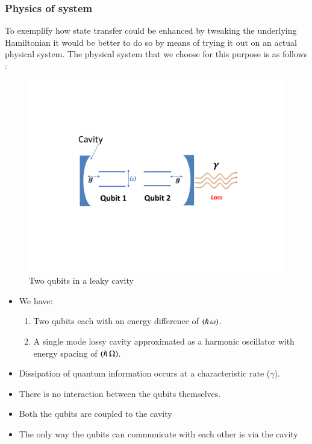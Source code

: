\subsubsection{Physics of system}
To exemplify how state transfer could be enhanced by tweaking the underlying Hamiltonian it would be better to do so by means of trying it out on an actual physical system. The physical system \citep{Tejas_APS1}  that we choose for this purpose is as follows : 
\begin{figure}[!h]
\centering
\includegraphics[width=0.8 \textwidth]{Figr1a.pdf}
\caption{Two qubits in a leaky cavity}
\label{fig:Figr1a}
\end{figure}


\begin{itemize}
\item We have:%
\begin{enumerate}
\item Two qubits each with an energy difference of $(\hslash\thinspace{\omega})$.
\item A single mode lossy cavity approximated as a harmonic oscillator with energy spacing of $(\hslash\thinspace{\Omega})$.  
\end{enumerate}
\item Dissipation of quantum information occurs at a characteristic rate ($\gamma$).
\item There is no interaction between the qubits themselves.
\item Both the qubits are coupled to the cavity
\item The only way the qubits can communicate with each other is via the cavity
\end{itemize}

